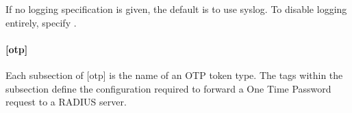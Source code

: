 \documentclass[letterpaper,10pt,english]{sphinxmanual}
\begin{document}
\begin{sphinxVerbatim}[commandchars=\\\{\}]
\PYG{p}{[}\PYG{p}{]}
      
      
      
      
\end{sphinxVerbatim}

\sphinxAtStartPar
If no logging specification is given, the default is to use syslog.
To disable logging entirely, specify .


\paragraph{{[}otp{]}}
\label{\detokenize{admin/conf_files/kdc_conf:otp}}\label{\detokenize{admin/conf_files/kdc_conf:id5}}
\sphinxAtStartPar
Each subsection of {[}otp{]} is the name of an OTP token type.  The tags
within the subsection define the configuration required to forward a
One Time Password request to a RADIUS server.
\end{document}
